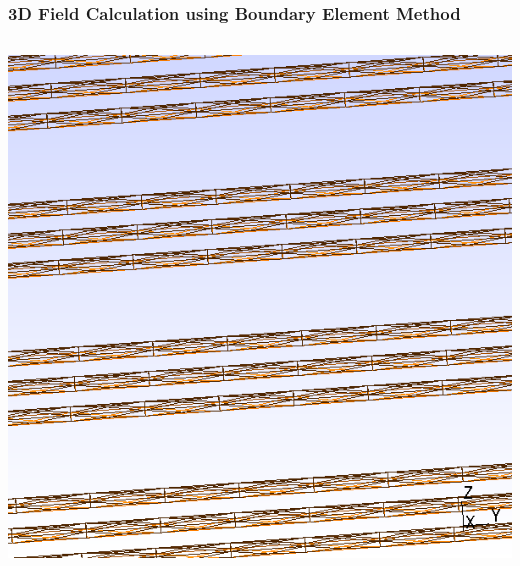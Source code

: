 \documentclass[xcolor=dvipsnames]{beamer}
\date{}
\begin{document}
\begin{frame}
  \frametitle{3D Field Calculation using Boundary Element Method}

  \begin{columns}
    \begin{column}{0.15\textwidth}
      \includegraphics[width=\textwidth]{parallel-mesh.png}      
      

\end{column}
\end{columns}
\end{frame}
\end{document}
